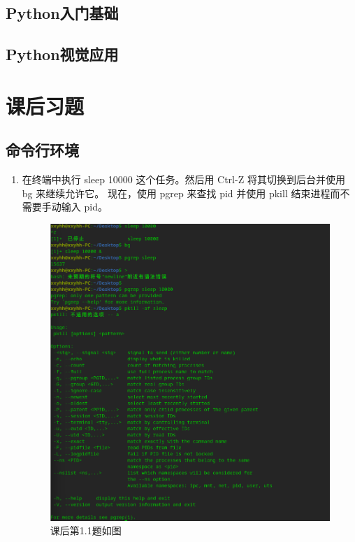 \documentclass{ctexart}
\begin{document}
\subsection{Python入门基础}


\subsection{Python视觉应用}

\section{课后习题}
\subsection{命令行环境}
\begin{enumerate}
    \item 在终端中执行 sleep 10000 这个任务。然后用 Ctrl-Z 将其切换到后台并使用 bg 来继续允许它。
    现在，使用 pgrep 来查找 pid 并使用 pkill 结束进程而不需要手动输入 pid。
\begin{figure}[H]
    \centering
    \includegraphics[width=14cm]{2483d6ccf68524e32c1d10cc130e50de.png}
    \caption{课后第1.1题如图}
    \label{fig:10}
\end{figure}


\end{enumerate}
\end{document}
